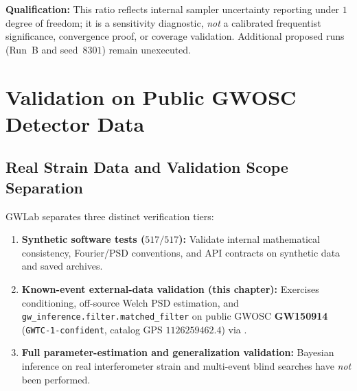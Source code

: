 \documentclass[11pt,a4paper]{report}
\begin{document}
\textbf{Qualification:} This ratio reflects internal sampler uncertainty reporting under $1$ degree of freedom; it is a sensitivity diagnostic, \emph{not} a calibrated frequentist significance, convergence proof, or coverage validation. Additional proposed runs (Run~B and seed~$8301$) remain unexecuted.

\chapter{Validation on Public GWOSC Detector Data}

\section{Real Strain Data and Validation Scope Separation}
GWLab separates three distinct verification tiers:
\begin{enumerate}[leftmargin=1.5em]
    \item \textbf{Synthetic software tests ($517/517$):} Validate internal mathematical consistency, Fourier/PSD conventions, and API contracts on synthetic data and saved archives.
    \item \textbf{Known-event external-data validation (this chapter):} Exercises conditioning, off-source Welch PSD estimation, and \texttt{gw\_inference.filter.matched\_filter} on public GWOSC \textbf{GW150914} (\texttt{GWTC-1-confident}, catalog GPS $1126259462.4$) via .
    \item \textbf{Full parameter-estimation and generalization validation:} Bayesian inference on real interferometer strain and multi-event blind searches have \emph{not} been performed.
\end{enumerate}
\end{document}
